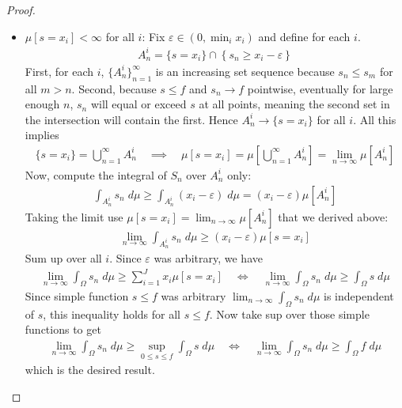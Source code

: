 \documentclass[12pt]{article}
\theoremstyle{plain}
\theoremstyle{definition}
\theoremstyle{remark}
\newcommand{\ra}{\rightarrow}
\newcommand{\ninf}{_{n=1}^\infty}
\newcommand{\limn}{\lim_{n\rightarrow\infty}}
\begin{document}
\begin{proof}
\begin{itemize}
  \item
    $\mu[s=x_i]<\infty$ for all $i$:
    Fix $\varepsilon \in (0,\min_i x_{i})$ and define for each $i$.
    \begin{align*}
      A_{n}^i
      =
      \{s = x_{i}\}
      \cap
      \left\{ s_n \geq x_{i} -\varepsilon\right\}
    \end{align*}
    First, for each $i$, $\{A_n^i\}\ninf$ is an increasing set sequence
    because $s_n\leq s_m$ for all $m>n$.
    Second, because $s\leq f$ and $s_n\ra f$ pointwise, eventually for
    large enough $n$, $s_n$ will equal or exceed $s$ at all points,
    meaning the second set in the intersection will contain the
    first. Hence $A_n^i\ra \{s=x_i\}$ for all $i$. All this implies
    \begin{align*}
      \{s=x_i\}
      = \bigcup\ninf A_n^i
      \quad\implies\quad
      \mu[s=x_i]
      = \mu\left[\bigcup\ninf A_n^i\right]
      = \limn \mu[A_n^i]
    \end{align*}
    Now, compute the integral of $S_n$ over $A_n^i$ only:
    \begin{align*}
      \int_{A_n^i} s_n\;d\mu
      \geq \int_{A_n^i} (x_i-\varepsilon)\;d\mu
      = (x_i-\varepsilon)\mu[A_n^i]
    \end{align*}
    Taking the limit use $\mu[s=x_i]=\limn \mu[A_n^i]$ that we derived
    above:
    \begin{align*}
      \limn \int_{A_n^i} s_n\;d\mu
      \geq (x_i-\varepsilon) \mu[s=x_i]
    \end{align*}
    Sum up over all $i$. Since $\varepsilon$ was arbitrary, we have
    \begin{align*}
      \limn \int_\Omega s_n \;d\mu
      \geq
      \sum_{i=1}^J x_i\mu[s=x_i]
      \quad\iff\quad
      \limn \int_\Omega s_n \;d\mu
      \geq \int_\Omega s \; d\mu
    \end{align*}
    Since simple function $s\leq f$ was arbitrary
    $\limn \int_\Omega s_n\;d\mu$ is independent of $s$, this inequality
    holds for all $s\leq f$. Now take sup over those simple functions to
    get
    \begin{align*}
      \limn \int_\Omega s_n \;d\mu
      \geq
      \sup_{0\leq s\leq f}\int_\Omega s \; d\mu
      \quad\iff\quad
      \limn \int_\Omega s_n \;d\mu
      \geq
      \int_\Omega f\;d\mu
    \end{align*}
    which is the desired result.
\end{itemize}
\end{proof}
\end{document}
